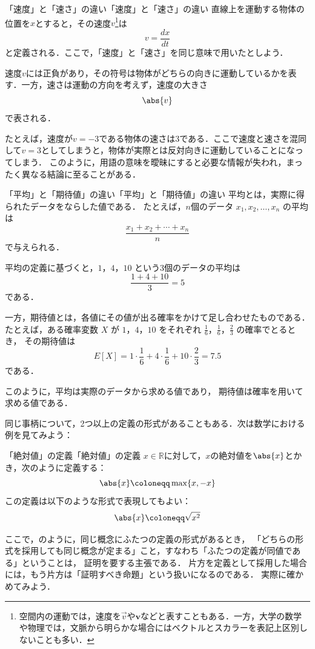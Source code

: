 \begin{example}{「速度」と「速さ」の違い}{「速度」と「速さ」の違い}
直線上を運動する物体の位置を$x$とすると，その速度$v$\footnote{空間内の運動では，速度を$\vec{v}$や$\bm{v}$などと表すこともある．一方，大学の数学や物理では，文脈から明らかな場合にはベクトルとスカラーを表記上区別しないことも多い．}は
\[
v=\frac{dx}{dt}
\]
と定義される．ここで，「速度」と「速さ」を同じ意味で用いたとしよう．

速度$v$には正負があり，その符号は物体がどちらの向きに運動しているかを表す．一方，速さは運動の方向を考えず，速度の大きさ
\[
\abs{v}
\]
で表される．

たとえば，速度が$v=-3$である物体の速さは$3$である．ここで速度と速さを混同して$v=3$としてしまうと，物体が実際とは反対向きに運動していることになってしまう．
このように，用語の意味を曖昧にすると必要な情報が失われ，まったく異なる結論に至ることがある．
\end{example}

\begin{example}{「平均」と「期待値」の違い}{「平均」と「期待値」の違い}
  平均とは，実際に得られたデータをならした値である．
  たとえば，$n$個のデータ $x_1,x_2,\dots,x_n$ の平均は
  \[
    \frac{x_1+x_2+\cdots+x_n}{n}
  \]
  で与えられる．

  平均の定義に基づくと，$1$，$4$，$10$ という3個のデータの平均は
  \[
    \frac{1+4+10}{3}=5
  \]
  である．

  一方，期待値とは，各値にその値が出る確率をかけて足し合わせたものである．
  たとえば，ある確率変数 $X$ が $1$，$4$，$10$ をそれぞれ
  $\frac{1}{6}$，$\frac{1}{6}$，$\frac{2}{3}$ の確率でとるとき，
  その期待値は
  \[
    E[X]=1\cdot\frac{1}{6}+4\cdot\frac{1}{6}+10\cdot\frac{2}{3}=7.5
  \]
  である．

  このように，平均は実際のデータから求める値であり，
  期待値は確率を用いて求める値である．
\end{example}


同じ事柄について，2つ以上の定義の形式があることもある．次は数学における例を見てみよう：

\begin{example}{「絶対値」の定義}{「絶対値」の定義}
  $ x \in \mathbb{R}$に対して，$x$の絶対値を$\abs{x}$とかき，次のように定義する：
  \[
    \abs{x} \coloneqq \max \{ x , -x \}
  \]
  この定義は以下のような形式で表現してもよい：
  \[
    \abs{x} \coloneqq  \sqrt{x^2}
  \]
\end{example}

ここで，のように，同じ概念にふたつの定義の形式があるとき，
「どちらの形式を採用しても同じ概念が定まる」こと，すなわち「ふたつの定義が同値である」ということは，
証明を要する主張である．
片方を定義として採用した場合には，もう片方は「証明すべき命題」という扱いになるのである．
実際に確かめてみよう．
 
